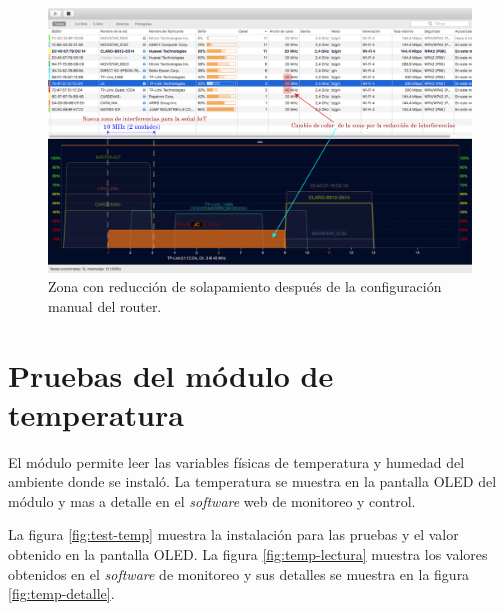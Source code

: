 
\begin{landscape} %
\begin{figure}[htpb]
\centering 
\includegraphics[width=1.5\textwidth]{./Figures/wifi/06.png}
\caption{Zona con reducción de solapamiento después de la configuración manual del router.}
\label{fig:test06}
\end{figure}
\end{landscape} %


\section{Pruebas del módulo de temperatura}

El módulo permite leer las variables físicas de temperatura y humedad del ambiente donde se instaló. La temperatura se muestra en la pantalla OLED del módulo y mas a detalle en el \emph{software} web de monitoreo y control.

La figura \ref{fig:test-temp} muestra la instalación para las pruebas y el valor obtenido en la pantalla OLED. La figura \ref{fig:temp-lectura} muestra los valores obtenidos en el \emph{software} de monitoreo y sus detalles se muestra en la figura \ref{fig:temp-detalle}.

